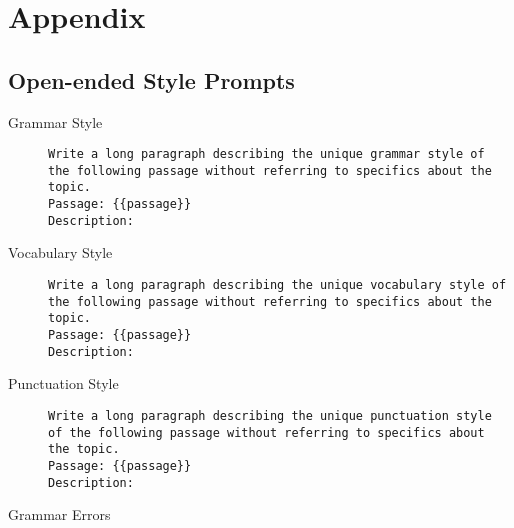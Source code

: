 %
\chapter{Appendix}
\label{sec:appendix}
\lstset{
  breakatwhitespace=true,
  breaklines=true,
  breakindent=0pt,
  numbers=none
}

\section{Open-ended Style Prompts}
\label{sec:appendix:openPrompts}
\begin{description}
  \item[Grammar Style]\leavevmode \newline
        \begin{minipage}{\linewidth}
          \begin{lstlisting}
Write a long paragraph describing the unique grammar style of the following passage without referring to specifics about the topic.
Passage: {{passage}}
Description:
\end{lstlisting}
        \end{minipage}
  \item[Vocabulary Style]\leavevmode \newline
        \begin{minipage}{\linewidth}
          \begin{lstlisting}
Write a long paragraph describing the unique vocabulary style of the following passage without referring to specifics about the topic.
Passage: {{passage}}
Description:
\end{lstlisting}
        \end{minipage}
  \item[Punctuation Style]\leavevmode \newline
        \begin{minipage}{\linewidth}
          \begin{lstlisting}
Write a long paragraph describing the unique punctuation style of the following passage without referring to specifics about the topic.
Passage: {{passage}}
Description:
\end{lstlisting}
        \end{minipage}
  \item[Grammar Errors]\leavevmode \newline
        \begin{minipage}{\linewidth}
          \begin{lstlisting}

\end{lstlisting}
\end{minipage}
\end{description}
